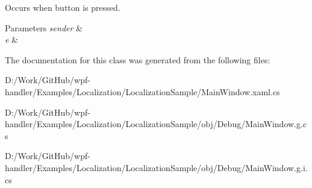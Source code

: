 Occurs when button is pressed. 


\begin{DoxyParams}{Parameters}
{\em sender} & \\
\hline
{\em e} & \\
\hline
\end{DoxyParams}


The documentation for this class was generated from the following files\+:\begin{DoxyCompactItemize}
\item 
D\+:/\+Work/\+Git\+Hub/wpf-\/handler/\+Examples/\+Localization/\+Localization\+Sample/Main\+Window.\+xaml.\+cs\item 
D\+:/\+Work/\+Git\+Hub/wpf-\/handler/\+Examples/\+Localization/\+Localization\+Sample/obj/\+Debug/Main\+Window.\+g.\+cs\item 
D\+:/\+Work/\+Git\+Hub/wpf-\/handler/\+Examples/\+Localization/\+Localization\+Sample/obj/\+Debug/Main\+Window.\+g.\+i.\+cs\end{DoxyCompactItemize}
